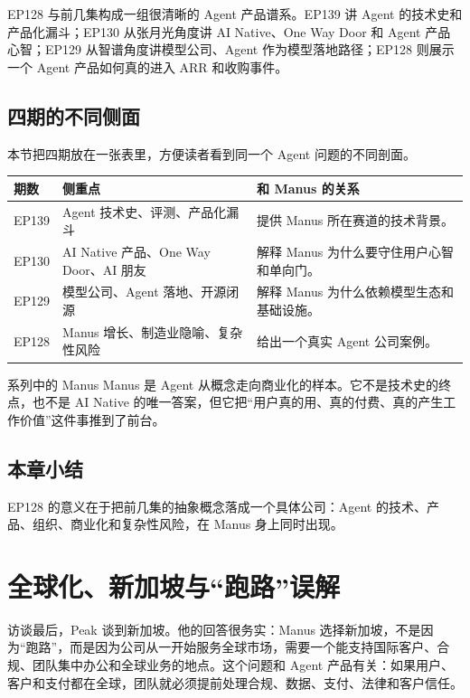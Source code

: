 \documentclass[a4paper]{article}
\begin{document}
EP128 与前几集构成一组很清晰的 Agent 产品谱系。EP139 讲 Agent 的技术史和产品化漏斗；EP130 从张月光角度讲 AI Native、One Way Door 和 Agent 产品心智；EP129 从智谱角度讲模型公司、Agent 作为模型落地路径；EP128 则展示一个 Agent 产品如何真的进入 ARR 和收购事件。

\subsection{四期的不同侧面}

本节把四期放在一张表里，方便读者看到同一个 Agent 问题的不同剖面。

\begin{longtable}{p{}p{}p{}}
\toprule
期数 & 侧重点 & 和 Manus 的关系 \\
\midrule
EP139 & Agent 技术史、评测、产品化漏斗 & 提供 Manus 所在赛道的技术背景。 \\
EP130 & AI Native 产品、One Way Door、AI 朋友 & 解释 Manus 为什么要守住用户心智和单向门。 \\
EP129 & 模型公司、Agent 落地、开源闭源 & 解释 Manus 为什么依赖模型生态和基础设施。 \\
EP128 & Manus 增长、制造业隐喻、复杂性风险 & 给出一个真实 Agent 公司案例。 \\
\bottomrule
\end{longtable}

\begin{importantbox}{系列中的 Manus}
Manus 是 Agent 从概念走向商业化的样本。它不是技术史的终点，也不是 AI Native 的唯一答案，但它把“用户真的用、真的付费、真的产生工作价值”这件事推到了前台。
\end{importantbox}

\subsection{本章小结}

EP128 的意义在于把前几集的抽象概念落成一个具体公司：Agent 的技术、产品、组织、商业化和复杂性风险，在 Manus 身上同时出现。

\section{全球化、新加坡与“跑路”误解}

访谈最后，Peak 谈到新加坡。他的回答很务实：Manus 选择新加坡，不是因为“跑路”，而是因为公司从一开始服务全球市场，需要一个能支持国际客户、合规、团队集中办公和全球业务的地点。这个问题和 Agent 产品有关：如果用户、客户和支付都在全球，团队就必须提前处理合规、数据、支付、法律和客户信任。
\end{document}
